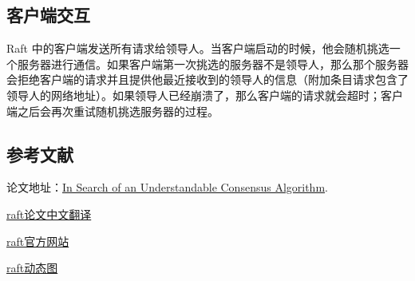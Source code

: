 \documentclass[
]{article}
\begin{document}
\hypertarget{header-n278}{%
\subsection{客户端交互}\label{header-n278}}

Raft
中的客户端发送所有请求给领导人。当客户端启动的时候，他会随机挑选一个服务器进行通信。如果客户端第一次挑选的服务器不是领导人，那么那个服务器会拒绝客户端的请求并且提供他最近接收到的领导人的信息（附加条目请求包含了领导人的网络地址）。如果领导人已经崩溃了，那么客户端的请求就会超时；客户端之后会再次重试随机挑选服务器的过程。

\hypertarget{header-n281}{%
\subsection{参考文献}\label{header-n281}}

论文地址：\href{https://raft.github.io/raft.pdf}{In Search of an
Understandable Consensus Algorithm}.

\href{https://github.com/maemual/raft-zh_cn/blob/master/raft-zh_cn.md}{raft论文中文翻译}

\href{https://raft.github.io/}{raft官方网站}

\href{http://thesecretlivesofdata.com/raft/}{raft动态图}
\end{document}
